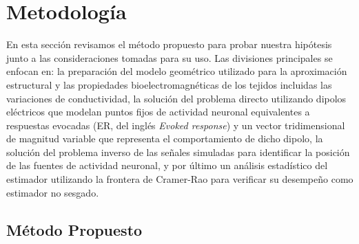 %
\chapter{Metodología}

\label{sec:methodology}


En esta sección revisamos el método propuesto para probar nuestra hipótesis junto a las consideraciones tomadas para su uso. Las divisiones principales se enfocan en: la preparación del modelo geométrico utilizado para la aproximación estructural y las propiedades bioelectromagnéticas de los tejidos incluidas las variaciones de conductividad, la solución del problema directo utilizando dipolos eléctricos que modelan puntos fijos de actividad neuronal equivalentes a respuestas evocadas (ER, del inglés \emph{Evoked response}) y un vector tridimensional de magnitud variable que representa el comportamiento de dicho dipolo, la solución del problema inverso de las señales simuladas para identificar la posición de las fuentes de actividad neuronal, y por último un análisis estadístico del estimador utilizando la frontera de Cramer-Rao para verificar su desempeño como estimador no sesgado.

\section{Método Propuesto}
\label{sec:methodology:method}

